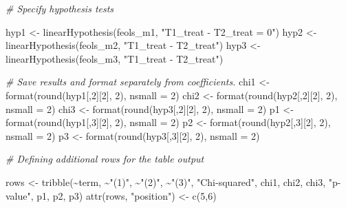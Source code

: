 \documentclass[
]{article}
\newenvironment{Shaded}{\begin{snugshade}}{\end{snugshade}}
\newcommand{\AttributeTok}[1]{\textcolor[rgb]{0.77,0.63,0.00}{#1}}
\newcommand{\CommentTok}[1]{\textcolor[rgb]{0.56,0.35,0.01}{\textit{#1}}}
\newcommand{\DecValTok}[1]{\textcolor[rgb]{0.00,0.00,0.81}{#1}}
\newcommand{\FunctionTok}[1]{\textcolor[rgb]{0.00,0.00,0.00}{#1}}
\newcommand{\NormalTok}[1]{#1}
\newcommand{\OtherTok}[1]{\textcolor[rgb]{0.56,0.35,0.01}{#1}}
\newcommand{\SpecialCharTok}[1]{\textcolor[rgb]{0.00,0.00,0.00}{#1}}
\newcommand{\StringTok}[1]{\textcolor[rgb]{0.31,0.60,0.02}{#1}}
\begin{document}
\begin{Shaded}
\begin{Highlighting}[]
\CommentTok{\# Specify hypothesis tests}

\NormalTok{hyp1 }\OtherTok{\textless{}{-}} \FunctionTok{linearHypothesis}\NormalTok{(feols\_m1, }\StringTok{"T1\_treat {-} T2\_treat = 0"}\NormalTok{)}
\NormalTok{hyp2 }\OtherTok{\textless{}{-}} \FunctionTok{linearHypothesis}\NormalTok{(feols\_m2, }\StringTok{"T1\_treat {-} T2\_treat"}\NormalTok{)}
\NormalTok{hyp3 }\OtherTok{\textless{}{-}} \FunctionTok{linearHypothesis}\NormalTok{(feols\_m3, }\StringTok{"T1\_treat {-} T2\_treat"}\NormalTok{)}

\CommentTok{\# Save results and format separately from coefficients.}
\NormalTok{chi1 }\OtherTok{\textless{}{-}} \FunctionTok{format}\NormalTok{(}\FunctionTok{round}\NormalTok{(hyp1[,}\DecValTok{2}\NormalTok{][}\DecValTok{2}\NormalTok{], }\DecValTok{2}\NormalTok{), }\AttributeTok{nsmall =} \DecValTok{2}\NormalTok{)}
\NormalTok{chi2 }\OtherTok{\textless{}{-}} \FunctionTok{format}\NormalTok{(}\FunctionTok{round}\NormalTok{(hyp2[,}\DecValTok{2}\NormalTok{][}\DecValTok{2}\NormalTok{], }\DecValTok{2}\NormalTok{), }\AttributeTok{nsmall =} \DecValTok{2}\NormalTok{)}
\NormalTok{chi3 }\OtherTok{\textless{}{-}} \FunctionTok{format}\NormalTok{(}\FunctionTok{round}\NormalTok{(hyp3[,}\DecValTok{2}\NormalTok{][}\DecValTok{2}\NormalTok{], }\DecValTok{2}\NormalTok{), }\AttributeTok{nsmall =} \DecValTok{2}\NormalTok{)}
\NormalTok{p1 }\OtherTok{\textless{}{-}} \FunctionTok{format}\NormalTok{(}\FunctionTok{round}\NormalTok{(hyp1[,}\DecValTok{3}\NormalTok{][}\DecValTok{2}\NormalTok{], }\DecValTok{2}\NormalTok{), }\AttributeTok{nsmall =} \DecValTok{2}\NormalTok{)}
\NormalTok{p2 }\OtherTok{\textless{}{-}} \FunctionTok{format}\NormalTok{(}\FunctionTok{round}\NormalTok{(hyp2[,}\DecValTok{3}\NormalTok{][}\DecValTok{2}\NormalTok{], }\DecValTok{2}\NormalTok{), }\AttributeTok{nsmall =} \DecValTok{2}\NormalTok{)}
\NormalTok{p3 }\OtherTok{\textless{}{-}} \FunctionTok{format}\NormalTok{(}\FunctionTok{round}\NormalTok{(hyp3[,}\DecValTok{3}\NormalTok{][}\DecValTok{2}\NormalTok{], }\DecValTok{2}\NormalTok{), }\AttributeTok{nsmall =} \DecValTok{2}\NormalTok{)}

\CommentTok{\# Defining additional rows for the table output}

\NormalTok{rows }\OtherTok{\textless{}{-}} \FunctionTok{tribble}\NormalTok{(}\SpecialCharTok{\textasciitilde{}}\NormalTok{term, }\SpecialCharTok{\textasciitilde{}}\StringTok{"(1)"}\NormalTok{, }\SpecialCharTok{\textasciitilde{}}\StringTok{"(2)"}\NormalTok{, }\SpecialCharTok{\textasciitilde{}}\StringTok{"(3)"}\NormalTok{,}
                \StringTok{"Chi{-}squared"}\NormalTok{, chi1, chi2, chi3,}
                \StringTok{"p{-}value"}\NormalTok{, p1, p2, p3)}
\FunctionTok{attr}\NormalTok{(rows, }\StringTok{"position"}\NormalTok{) }\OtherTok{\textless{}{-}} \FunctionTok{c}\NormalTok{(}\DecValTok{5}\NormalTok{,}\DecValTok{6}\NormalTok{)}




\end{Highlighting}
\end{Shaded}
\end{document}
